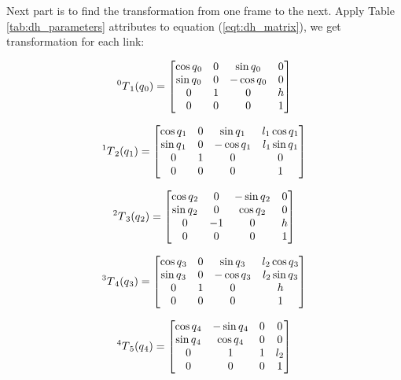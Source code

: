 \documentclass[conference]{IEEEtran}
\def\SP#1{\textsuperscript{\textcolor{black}{#1}}}
\def\SB#1{\textsubscript{\textcolor{black}{#1}}}
\begin{document}
  Next part is to find the transformation from one frame to the next. Apply Table \ref{tab:dh_parameters} attributes to equation (\ref{eqt:dh_matrix}), we get transformation for each link:
  \begin{center}
  	\begin{equation} \label{eqt:transform_first}
  	\SP{0}T\SB{1}(q\SB{0}) =
  	\begin{bmatrix}
  	\cos{q\SB{0}} 	& 0 	& \sin{q\SB{0}} 	& 0\\
  	\sin{q\SB{0}} 	& 0 	& -\cos{q\SB{0}} 	& 0\\
  	0 				& 1 	& 0 				& h\\
  	0 				& 0 	& 0 				& 1
  	\end{bmatrix}
  	\end{equation}
  	
  	\begin{equation}
  	\SP{1}T\SB{2}(q\SB{1}) =
  	\begin{bmatrix}
  	\cos{q\SB{1}} 	& 0 	& \sin{q\SB{1}} 	& l_1\cos{q\SB{1}}\\
  	\sin{q\SB{1}} 	& 0 	& -\cos{q\SB{1}} 	& l_1\sin{q\SB{1}}\\
  	0 				& 1 	& 0 				& 0\\
  	0 				& 0 	& 0 				& 1
  	\end{bmatrix}
  	\end{equation}
  	
  	\begin{equation}
  	\SP{2}T\SB{3}(q\SB{2}) =
  	\begin{bmatrix}
  	\cos{q\SB{2}} 	& 0 	& -\sin{q\SB{2}} 	& 0\\
  	\sin{q\SB{2}} 	& 0 	& \cos{q\SB{2}} 	& 0\\
  	0 				& -1 	& 0 				& h\\
  	0 				& 0 	& 0 				& 1
  	\end{bmatrix}
  	\end{equation}
  	
  	\begin{equation}
  	\SP{3}T\SB{4}(q\SB{3}) =
  	\begin{bmatrix}
  	\cos{q\SB{3}} 	& 0 	& \sin{q\SB{3}} 	& l_2\cos{q\SB{3}}\\
  	\sin{q\SB{3}} 	& 0 	& -\cos{q\SB{3}} 	& l_2\sin{q\SB{3}}\\
  	0 				& 1 	& 0 				& h\\
  	0 				& 0 	& 0 				& 1
  	\end{bmatrix}
  	\end{equation}
  	
  	\begin{equation}
  	\SP{4}T\SB{5}(q\SB{4}) =
  	\begin{bmatrix}
  	\cos{q\SB{4}} 	& -\sin{q\SB{4}} 	& 0 	& 0\\
  	\sin{q\SB{4}} 	& \cos{q\SB{4}} 	& 0 	& 0\\
  	0 				& 1 				& 1 	& l_2\\
  	0 				& 0 				& 0 	& 1
  	\end{bmatrix}
  	\end{equation}
  \end{center}  \quad \\ 
\end{document}
